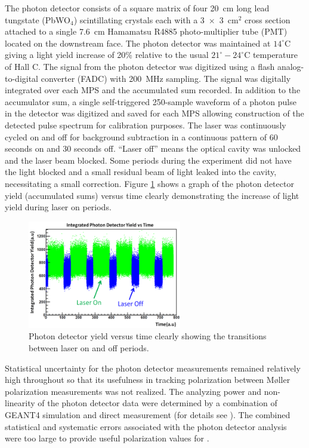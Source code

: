 The photon detector consists of a square matrix of four 20~cm long lead tungstate (PbWO$_4$) scintillating crystals each with a 3~$\times$~3~cm$^2$ cross section attached to a single 7.6~cm Hamamatsu R4885 photo-multiplier tube (PMT) located on the downstream face. The photon detector was maintained at $14^{\circ}$C giving a light yield increase of 20\% relative to the usual $21^{\circ}-24^{\circ}$C temperature of Hall C. The signal from the photon detector was digitized using a flash analog-to-digital converter (FADC) with 200~MHz sampling. The signal was digitally integrated over each MPS and the accumulated sum recorded. In addition to the accumulator sum, a single self-triggered 250-sample waveform of a photon pulse in the detector was digitized and saved for each MPS allowing construction of the detected pulse spectrum for calibration purposes. The laser was continuously cycled on and off for background subtraction in a continuous pattern of 60 seconds on and 30 seconds off. ``Laser off'' means the optical cavity was unlocked and the laser beam blocked. Some periods during the experiment did not have the light blocked and a small residual beam of light leaked into the cavity, necessitating a small correction. Figure \ref{fig:laser_onoff} shows a graph of the photon detector yield (accumulated sums) versus time clearly demonstrating the increase of light yield during laser on periods.
\begin{figure}[ht]
\centering
\includegraphics[width=0.6\textwidth]{Pictures/laser_onoff.png}
\caption{Photon detector yield versus time clearly showing the transitions between laser on and off periods.}
\label{fig:laser_onoff}
\end{figure}
Statistical uncertainty for the photon detector measurements remained relatively high throughout \Qs so that its usefulness in tracking polarization between M\o ller polarization measurements was not realized. The analyzing power and non-linearity of the photon detector data were determined by a combination of GEANT4 simulation and direct measurement (for details see \cite{Cornejo}). The combined statistical and systematic errors associated with the photon detector analysis were too large to provide useful polarization values for \Q.

